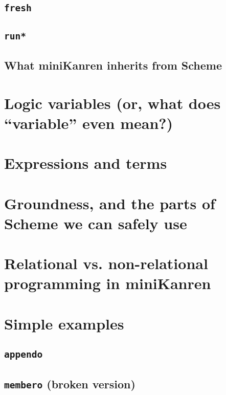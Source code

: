 \documentclass{book}
\begin{document}
\subsection{\texttt{fresh}}

\subsection{\texttt{run*}}

\subsection{What miniKanren inherits from Scheme}

\section{Logic variables (or, what does ``variable'' even mean?)}


\section{Expressions and terms}

\section{Groundness, and the parts of Scheme we can safely use}

\section{Relational vs. non-relational programming in miniKanren}

\section{Simple examples}

\subsection{\texttt{appendo}}

\subsection{\texttt{membero} (broken version)}
\end{document}
